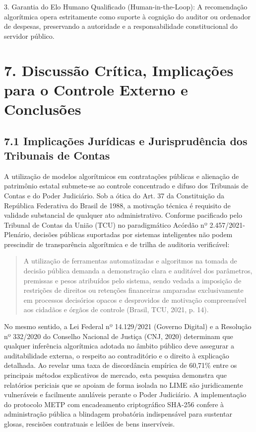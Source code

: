 \documentclass[10pt,a4paper,journal]{article}
\begin{document}
3. Garantia do Elo Humano Qualificado (Human-in-the-Loop): A recomendação algorítmica opera estritamente como suporte à cognição do auditor ou ordenador de despesas, preservando a autoridade e a responsabilidade constitucional do servidor público.

\section{7. Discussão Crítica, Implicações para o Controle Externo e Conclusões}
\subsection{7.1 Implicações Jurídicas e Jurisprudência dos Tribunais de Contas}
A utilização de modelos algorítmicos em contratações públicas e alienação de patrimônio estatal submete-se ao controle concentrado e difuso dos Tribunais de Contas e do Poder Judiciário. Sob a ótica do Art. 37 da Constituição da República Federativa do Brasil de 1988, a motivação técnica é requisito de validade substancial de qualquer ato administrativo. Conforme pacificado pelo Tribunal de Contas da União (TCU) no paradigmático Acórdão nº 2.457/2021-Plenário, decisões públicas suportadas por sistemas inteligentes não podem prescindir de transparência algorítmica e de trilha de auditoria verificável:

\begin{quote}
\small A utilização de ferramentas automatizadas e algoritmos na tomada de decisão pública demanda a demonstração clara e auditável dos parâmetros, premissas e pesos atribuídos pelo sistema, sendo vedada a imposição de restrições de direitos ou retenções financeiras amparadas exclusivamente em processos decisórios opacos e desprovidos de motivação compreensível aos cidadãos e órgãos de controle (Brasil, TCU, 2021, p. 14).
\end{quote}
No mesmo sentido, a Lei Federal nº 14.129/2021 (Governo Digital) e a Resolução nº 332/2020 do Conselho Nacional de Justiça (CNJ, 2020) determinam que qualquer inferência algorítmica adotada no âmbito público deve assegurar a auditabilidade externa, o respeito ao contraditório e o direito à explicação detalhada. Ao revelar uma taxa de discordância empírica de 60,71\% entre os principais métodos explicativos de mercado, esta pesquisa demonstra que relatórios periciais que se apoiam de forma isolada no LIME são juridicamente vulneráveis e facilmente anuláveis perante o Poder Judiciário. A implementação do protocolo METP com encadeamento criptográfico SHA-256 confere à administração pública a blindagem probatória indispensável para sustentar glosas, rescisões contratuais e leilões de bens inservíveis.
\end{document}
